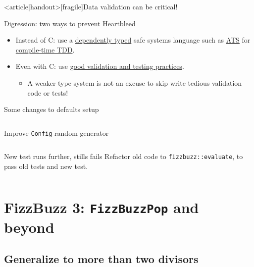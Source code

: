 \begin{frame}<article|handout>[fragile]{Data validation can be critical!}
  \begin{block}{Digression: two ways to prevent \href{http://heartbleed.com/}{Heartbleed}}
    \begin{itemize}
    \item Instead of C: use a \href{http://en.wikipedia.org/wiki/Dependent_type}{dependently typed} safe systems language such as \href{http://www.ats-lang.org/}{ATS} for \href{http://bluishcoder.co.nz/2014/04/11/preventing-heartbleed-bugs-with-safe-languages.html}{compile-time TDD}.
    \item Even with C: use \href{http://martinfowler.com/articles/testing-culture.html}{good validation and testing practices}.
      \begin{itemize}
      \item A weaker type system is not an \alert{excuse} to skip
        write tedious validation code or tests!
      \end{itemize}
    \end{itemize}
  \end{block}
\end{frame}

\begin{frame}[fragile]{Some changes to defaults setup}
  \inputminted{rust}{Defaults1a.rs}
\end{frame}

\begin{frame}[fragile]{Improve \texttt{Config} random generator}
  \inputminted[gobble=2]{rust}{FizzBuzzSpec7.rs}
\end{frame}

\begin{frame}[fragile]{New test runs further, stills fails}
  Refactor old code to \texttt{fizzbuzz::evaluate}, to pass old tests and new test.

  \inputminted{rust}{FizzBuzz3Compile.rs}
\end{frame}

\section{FizzBuzz 3: \texttt{FizzBuzzPop} and beyond}

\subsection{Generalize to more than two divisors}

